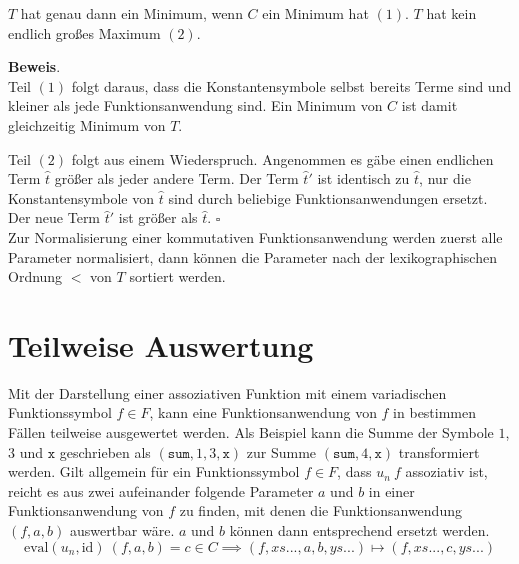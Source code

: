 \begin{lemma} \label{lemMinMax}
$T$ hat genau dann ein Minimum, wenn $C$ ein Minimum hat $(1)$. $T$ hat kein endlich großes Maximum $(2)$.
\end{lemma}

\textbf{Beweis}.\\
Teil $(1)$ folgt daraus, dass die Konstantensymbole selbst bereits Terme sind und kleiner als jede Funktionsanwendung sind. Ein Minimum von $C$ ist damit gleichzeitig Minimum von $T$.

Teil $(2)$ folgt aus einem Wiederspruch. Angenommen es gäbe einen endlichen Term $\hat t$ größer als jeder andere Term. Der Term $\hat t'$ ist identisch zu $\hat t$, nur die Konstantensymbole von $\hat t$ sind durch beliebige Funktionsanwendungen ersetzt. Der neue Term $\hat t'$ ist größer als $\hat t$.
\hfill $\square$\\

Zur Normalisierung einer kommutativen Funktionsanwendung werden zuerst alle Parameter normalisiert, dann können die Parameter nach der lexikographischen Ordnung $<$ von $T$ sortiert werden. 

\section{Teilweise Auswertung} \label{subsecNormalKombinieren}

\begin{algorithm}
\DontPrintSemicolon
\caption{$\mathrm{combine} \colon T \rightarrow T$}\label{combine}

\end{algorithm}

Mit der Darstellung einer assoziativen Funktion mit einem variadischen Funktionssymbol $f \in F$, kann eine Funktionsanwendung von $f$ in bestimmen Fällen teilweise ausgewertet werden. Als Beispiel kann die Summe der Symbole $1$, $3$ und $\texttt{x}$ geschrieben als $(\texttt{sum}, 1, 3, \texttt{x})$ zur Summe $(\texttt{sum}, 4, \texttt{x})$ transformiert werden. 
Gilt allgemein für ein Funktionssymbol $f \in F$, dass $u_n~f$ assoziativ ist, reicht es aus zwei aufeinander folgende Parameter $a$ und $b$ in einer Funktionsanwendung von $f$ zu finden, mit denen die Funktionsanwendung $(f, a, b)$ auswertbar wäre. $a$ und $b$ können dann entsprechend ersetzt werden.
$$\mathrm{eval}(u_n, \mathrm{id})~(f, a, b) = c \in C \implies (f, xs..., a, b, ys...) \mapsto (f, xs..., c, ys...)$$

